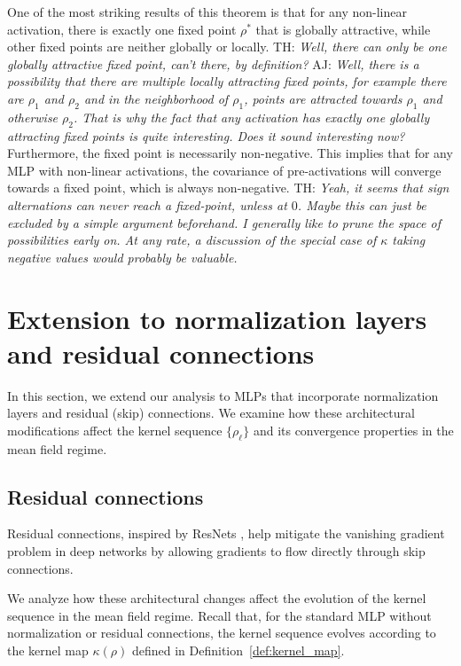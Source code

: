 \documentclass[twoside]{article}
\theoremstyle{definition}
\newcommand{\thomas}[1]{{\color{blue}TH:  \textit{#1}}}
\newcommand{\amir}[1]{{\color{cyan}AJ:  \textit{#1}}}
\begin{document}
One of the most striking results of this theorem is that for any non-linear activation, there is exactly one fixed point $\rho^*$ that is globally attractive, while other fixed points are neither globally or locally. 
\thomas{Well, there can only be one globally attractive fixed point, can't there, by definition?} 
\amir{Well, there is a possibility that there are multiple locally attracting fixed points, for example there are $\rho_1$ and $\rho_2$ and in the neighborhood of $\rho_1$, points are attracted towards $\rho_1$ and otherwise $\rho_2$. That is why the fact that any activation has exactly one globally attracting fixed points is quite interesting. Does it sound interesting now? }
Furthermore, the fixed point is necessarily non-negative. This implies that for any MLP with non-linear activations, the covariance of pre-activations will converge towards a fixed point, which is always non-negative. 
\thomas{Yeah, it seems that sign alternations can never reach a fixed-point, unless at $0$. Maybe this can just be excluded by a simple argument beforehand. I generally like to prune the space of possibilities early on. At any rate, a discussion of the special case of $\kappa$ taking negative values would probably be valuable.}
 



\section{Extension to normalization layers and residual connections}

In this section, we extend our analysis to MLPs that incorporate normalization layers and residual (skip) connections. We examine how these architectural modifications affect the kernel sequence $\{\rho_\ell\}$ and its convergence properties in the mean field regime.


\subsection{Residual connections}

Residual connections, inspired by ResNets \citep{he2016deep}, help mitigate the vanishing gradient problem in deep networks by allowing gradients to flow directly through skip connections. 


We analyze how these architectural changes affect the evolution of the kernel sequence in the mean field regime. Recall that, for the standard MLP without normalization or residual connections, the kernel sequence evolves according to the kernel map $\kappa(\rho)$ defined in Definition~\ref{def:kernel_map}.
\end{document}
